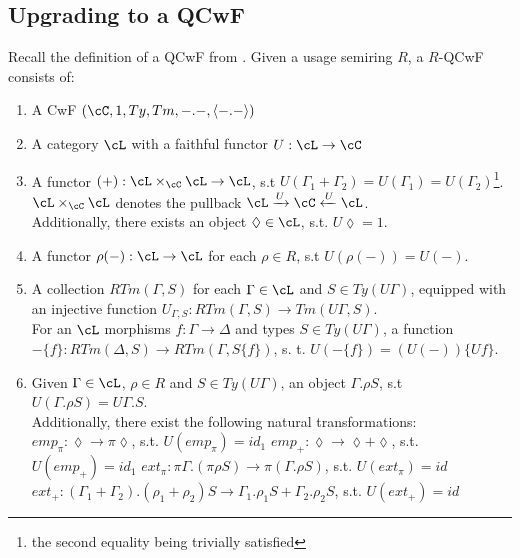 \documentclass[12pt,a4paper]{article}
\begin{document}
\subsection*{Upgrading to a QCwF}
Recall the definition of a QCwF from \cite{Atkey2018}.
Given a usage semiring $R$, a $R$-QCwF consists of:
\begin{enumerate}[noitemsep]
  \item A CwF $(\cC, 1, Ty, Tm, -.-, \langle-.-\rangle)$
  
  \item A category $\cL$ with a faithful functor $U : \cL \to \cC$
  
  \item A functor $(+) : \cL \times_\cC \cL \to \cL$, s.t $U(\Gamma_1 + \Gamma_2) = U(\Gamma_1) = U(\Gamma_2)$\footnote{the second equality being trivially satisfied}. $\cL \times_\cC \cL$ denotes the pullback $\cL \xrightarrow{U} \cC \xleftarrow{U} \cL$.\\
  Additionally, there exists an object $\lozenge \in \cL$, s.t. $U\lozenge = 1$.
  
  \item A functor $\rho(-): \cL \to \cL$ for each $\rho \in R$, s.t $U(\rho(-)) = U(-)$.
  
  \item A collection $RTm(\Gamma, S)$ for each $\Gamma \in \cL$ and $S \in Ty(U\Gamma)$, equipped with an injective function $U_{\Gamma,S} : RTm(\Gamma, S) \to Tm(U\Gamma, S)$.\\
  For an $\cL$ morphisms $f: \Gamma \to \Delta$ and types $S \in Ty(U\Gamma)$, a function $-\{f\} : RTm(\Delta, S) \to RTm(\Gamma, S\{f\})$, s. t. $U(-\{f\}) = (U(-))\{Uf\}$.
         
  \item Given $\Gamma \in \cL$, $\rho \in R$ and $S \in Ty(U\Gamma)$, an object $\Gamma. \rho S$, s.t $U(\Gamma. \rho S) = U\Gamma.S$.\\
  Additionally, there exist the following natural transformations:
  \subitem $emp_\pi : \lozenge \to \pi\lozenge$, s.t. $U(emp_\pi)=id_1$ 
  \subitem $emp_+ : \lozenge \to \lozenge + \lozenge$, s.t. $U(emp_+)=id_1$ 
  \subitem $ext_\pi : \pi\Gamma. (\pi\rho S) \to \pi(\Gamma. \rho S)$, s.t. $U(ext_\pi) = id$ 
  \subitem $ext_+ : (\Gamma_1 + \Gamma_2).(\rho_1 + \rho_2)S \to \Gamma_1.\rho_1 S + \Gamma_2 . \rho_2 S$, s.t.  $U(ext_+) = id$ 
  

\end{enumerate}
\end{document}
